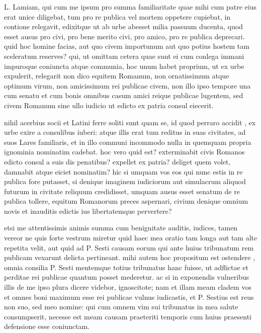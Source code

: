  L. Lamiam, qui cum me ipsum pro summa familiaritate quae mihi cum patre eius erat unice diligebat, tum pro re publica vel mortem oppetere cupiebat, in contione relegavit, edixitque ut ab urbe abesset milia passuum ducenta, quod esset ausus pro civi, pro bene merito civi, pro amico, pro re publica deprecari. quid hoc homine facias, aut quo civem importunum aut quo potius hostem tam sceleratum reserves? qui, ut omittam cetera quae sunt ei cum conlega immani impuroque coniuncta atque communia, hoc unum habet proprium, ut ex urbe expulerit, relegarit non dico equitem Romanum, non ornatissimum atque optimum virum, non amicissimum rei publicae civem, non illo ipso tempore una cum senatu et cum bonis omnibus casum amici reique publicae lugentem, sed civem Romanum sine ullo iudicio ut edicto ex patria consul eiecerit.

 nihil acerbius socii et Latini ferre soliti sunt quam se, id quod perraro accidit , ex urbe exire a consulibus iuberi: atque illis erat tum reditus in suas civitates, ad suos Lares familiaris, et in illo communi incommodo nulla in quemquam propria ignominia nominatim cadebat. hoc vero quid est? exterminabit civis Romanos edicto consul a suis dis penatibus? expellet ex patria? deliget quem volet, damnabit atque eiciet nominatim? hic si umquam vos eos qui nunc estis in re publica fore putasset, si denique imaginem iudiciorum aut simulacrum aliquod futurum in civitate reliquum credidisset, umquam ausus esset senatum de re publica tollere, equitum Romanorum preces aspernari, civium denique omnium novis et inauditis edictis ius libertatemque pervertere?

 etsi me attentissimis animis summa cum benignitate auditis, iudices, tamen vereor ne quis forte vestrum miretur quid haec mea oratio tam longa aut tam alte repetita velit, aut quid ad P. Sesti causam eorum qui ante huius tribunatum rem publicam vexarunt delicta pertineant. mihi autem hoc propositum est ostendere , omnia consilia P. Sesti mentemque totius tribunatus hanc fuisse, ut adflictae et perditae rei publicae quantum posset mederetur. ac si in exponendis vulneribus illis de me ipso plura dicere videbor, ignoscitote; nam et illam meam cladem vos et omnes boni maximum esse rei publicae vulnus iudicastis, et P. Sestius est reus non suo, sed meo nomine: qui cum omnem vim sui tribunatus in mea salute consumpserit, necesse est meam causam praeteriti temporis cum huius praesenti defensione esse coniunctam.

